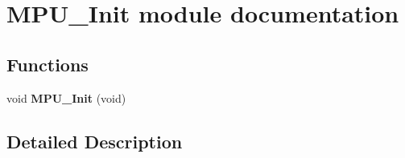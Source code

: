 \hypertarget{group___m_p_u___init__module}{}\section{M\+P\+U\+\_\+\+Init module documentation}
\label{group___m_p_u___init__module}
\subsection*{Functions}
\begin{DoxyCompactItemize}
\item 
void {\bfseries M\+P\+U\+\_\+\+Init} (void)\hypertarget{group___m_p_u___init__module_ga550b7018ed077554e848eeb2ce1285b8}{}\label{group___m_p_u___init__module_ga550b7018ed077554e848eeb2ce1285b8}

\end{DoxyCompactItemize}


\subsection{Detailed Description}
